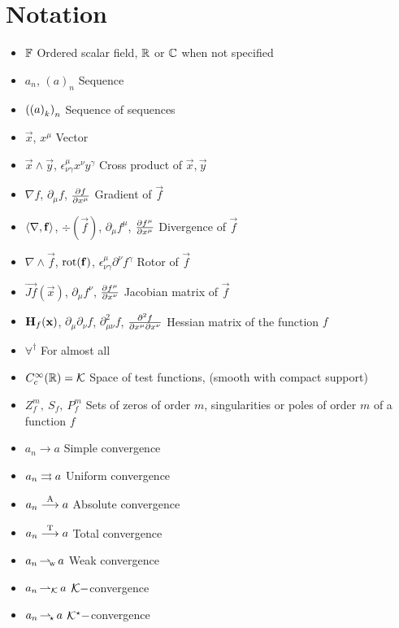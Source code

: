 \documentclass[../complete.tex]{subfiles}
\begin{document}
\chapter*{Notation}
\begin{itemize}
\item $\mathbb{F}$ Ordered scalar field, $\mathbb{R}$ or $\mathbb{C}$ when not specified
\item $a_n$, $(a)_n$ Sequence
\item $\left(\left(a\right)_{k}\right)_{n}$ Sequence of sequences
\item $\vec{x}$, $x^\mu$ Vector
\item $\vec{x}\wedge\vec{y}$, $\epsilon^\mu_{\nu\gamma}x^\nu y^\gamma$ Cross product of $\vec{x},\vec{y}$
\item $\nabla f$, $\partial_\mu f$, $\pdv{f}{x^\mu}$ Gradient of $\vec{f}$
\item $\langle \nabla, \mathbf{f} \rangle$, $\div(\vec{f})$, $\partial_\mu f^\mu$, $\pdv{f^\mu}{x^\mu}$ Divergence of $\vec{f}$
\item $\nabla\wedge\vec{f}$, $\operatorname{rot}(\mathbf{f})$, $\epsilon^\mu_{\nu\gamma}\partial^\nu f^\gamma$ Rotor of $\vec{f}$
\item $\vec{Jf}(\vec{x})$, $\partial_\mu f^\nu$, $\pdv{f^\mu}{x^\nu}$ Jacobian matrix of $\vec{f}$
\item $\mathbf{H}_{f}(\mathbf{x})$, $\partial_\mu\partial_\nu f$, $\partial^2_{\mu\nu}f$, $\pdv[2]{f}{x^\mu}{x^\nu}$ Hessian matrix of the function $f$
\item $\forall^{\dagger}$ For almost all
\item $C_c^\infty(\mathbb{R})=\mathcal{K}$ Space of test functions, (smooth with compact support)
\item $Z_f^m,\ S_f,\ P_f^m$ Sets of zeros of order $m$, singularities or poles of order $m$ of a function $f$
\item $a_n\to a$ Simple convergence
\item $a_n\rightrightarrows a$ Uniform convergence
\item $a_n\overset{\mathrm{A}}{\longrightarrow} a$ Absolute convergence
\item $a_n\overset{\mathrm{T}}{\longrightarrow} a$ Total convergence
\item $a_n\operatorname{\rightharpoonup_{\! w}} a$ Weak convergence
\item $a_n\operatorname{\rightharpoonup_{\mathcal{K}}} a$ $\mathcal{K}-$convergence
\item $a_n\operatorname{\rightharpoonup_{\!\star}} a$ $\mathcal{K}^\star-$convergence
\end{itemize}
\end{document}
